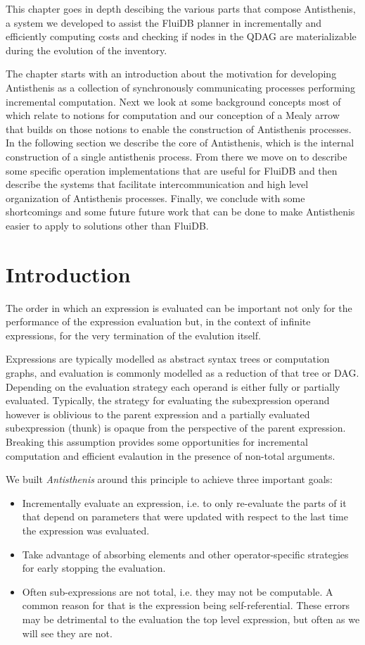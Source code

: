 This chapter goes in depth descibing the various parts that compose
Antisthenis, a system we developed to assist the FluiDB planner in
incrementally and efficiently computing costs and checking if nodes in
the QDAG are materializable during the evolution of the inventory.

The chapter starts with an introduction about the motivation for
developing Antisthenis as a collection of synchronously communicating
processes performing incremental computation. Next we look at some
background concepts most of which relate to notions for computation
and our conception of a Mealy arrow that builds on those notions to
enable the construction of Antisthenis processes. In the following
section we describe the core of Antisthenis, which is the internal
construction of a single antisthenis process. From there we move on to
describe some specific operation implementations that are useful for
FluiDB and then describe the systems that facilitate
intercommunication and high level organization of Antisthenis
processes. Finally, we conclude with some shortcomings and some future
future work that can be done to make Antisthenis easier to apply to
solutions other than FluiDB.

\section{Introduction}
\label{sec:antisthenis_intro}

The order in which an expression is evaluated can be important not
only for the performance of the expression evaluation but, in the
context of infinite expressions, for the very termination of the
evalution itself.

Expressions are typically modelled as abstract syntax trees or
computation graphs, and evaluation is commonly modelled as a reduction
of that tree or DAG. Depending on the evaluation strategy each operand
is either fully or partially evaluated. Typically, the strategy for
evaluating the subexpression operand however is oblivious to the
parent expression and a partially evaluated subexpression (thunk) is
opaque from the perspective of the parent expression. Breaking this
assumption provides some opportunities for incremental computation and
efficient evalaution in the presence of non-total arguments.

We built \emph{Antisthenis} around this principle to achieve three
important goals:

\begin{itemize}
\item Incrementally evaluate an expression, i.e. to only re-evaluate
  the parts of it that depend on parameters that were updated with
  respect to the last time the expression was evaluated.
\item Take advantage of absorbing elements and other operator-specific
  strategies for early stopping the evaluation.
\item Often sub-expressions are not total, i.e. they may not be
  computable. A common reason for that is the expression being
  self-referential. These errors may be detrimental to the evaluation
  the top level expression, but often as we will see they are not.
\end{itemize}

